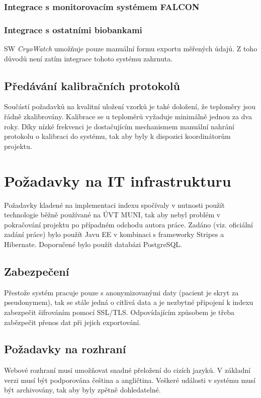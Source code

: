 \subsubsection{Integrace s monitorovacím systémem FALCON}

\subsubsection{Integrace s ostatními biobankami}
SW \textit{CryoWatch} umožňuje pouze manuální formu exportu měřených údajů. Z toho důvodů není zatím integrace tohoto systému zahrnuta.

\subsection{Předávání kalibračních protokolů}
Součástí požadavků na kvalitní uložení vzorků je také doložení, že teploměry jsou řádně zkalibrovány. Kalibrace se u teploměrů vyžaduje minimálně jednou za dva roky. Díky nízké frekvenci je dostačujícím mechanismem manuální nahrání protokolu o kalibraci do systému, tak aby byly k dispozici koordinátorům projektu.

\section{Požadavky na IT infrastrukturu}
Požadavky kladené na implementaci indexu spočívaly v nutnosti použít technologie běžně používané na ÚVT MUNI, tak aby nebyl problém v pokračování projektu po případném odchodu autora práce. Zadáno (viz. oficiální zadání práce) bylo použít Javu EE v kombinaci s frameworky Stripes a Hibernate. Doporučené bylo použít databázi PostgreSQL.

\subsection{Zabezpečení}
Přestože systém pracuje pouze s anonymizovanými daty (pacient je skryt za pseudonymem), tak se stále jedná o citlivá data a je nezbytné připojení k indexu zabezpečit šifrováním pomocí SSL/TLS.	
Odpovídajícím způsobem je třeba zabězpečit přenos dat při jejich exportování.

\subsection{Požadavky na rozhraní}
Webové rozhraní musí umožňovat snadné přeložení do cizích jazyků. V základní verzi musí být podporována čeština a angličtina. 
Veškeré události v systému musí být archivovány, tak aby byly zpětně dohledatelné.

